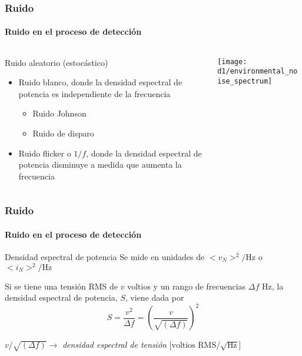 \documentclass{beamer}
\begin{document}
\begin{frame}
\frametitle{Ruido}
\framesubtitle{Ruido en el proceso de detecci\'on}
\begin{columns}
\begin{column}{0.5\textwidth}
\begin{block}{Ruido aleatorio (estoc\'astico)}
\begin{itemize}
\item Ruido blanco, donde la densidad espectral de potencia es
independiente de la frecuencia
\begin{itemize}
\item Ruido Johnson
\item Ruido de disparo 
\end{itemize}
\item Ruido flicker o $1/f$, donde la densidad espectral de potencia disminuye a
medida que aumenta la frecuencia
\end{itemize}
\end{block}
\end{column}
\begin{column}{0.5\textwidth}
\begin{center}
\texttt{[image: d1/environmental\_noise\_spectrum]}
\end{center}
\end{column}
\end{columns}
\end{frame} 

\begin{frame}
\frametitle{Ruido}
\framesubtitle{Ruido en el proceso de detecci\'on}
\begin{block}{Densidad espectral de potencia}
Se mide en unidades de $<\!v_N\!>^2/\text{Hz}$ o $<\!i_N\!>^2/\text{Hz}$

Si se tiene una tensi\'on RMS de $v$ voltios y un rango de frecuencias $\Delta f$
Hz, la densidad espectral de potencia, $S$, viene dada por
{\color{blue}$$S = \frac{v^2}{\Delta f} = \left(\frac{v}{\sqrt{(\Delta
f)}}\right)^2$$}

$v/\sqrt{(\Delta f)} \rightarrow$ \textit{densidad espectral de tensi\'on}
[$\text{voltios RMS}/\sqrt{\text{Hz}}$]
\end{block}
\end{frame} 
\end{document}
